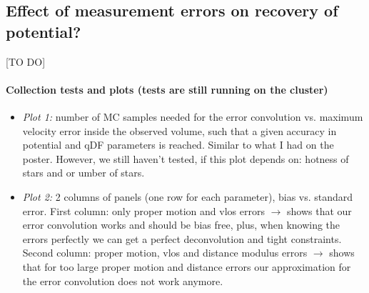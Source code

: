 \subsection{Effect of measurement errors on recovery of potential?} \label{sec:results_errors}

[TO DO]

\paragraph{Collection tests and plots (tests are still running on the cluster)}

\begin{itemize}
\item \emph{Plot 1:} number of MC samples needed for the error convolution vs. maximum velocity error inside the observed volume, such that a given accuracy in potential and qDF parameters is reached. Similar to what I had on the poster. However, we still haven't tested, if this plot depends on: hotness of stars and or umber of stars.

\item \emph{Plot 2:} 2 columns of panels (one row for each parameter), bias vs. standard error. First column: only proper motion and vlos errors $\longrightarrow$ shows that our error convolution works and should be bias free, plus, when knowing the errors perfectly we can get a perfect deconvolution and tight constraints. Second column: proper motion, vlos and distance modulus errors $\longrightarrow$ shows that for too large proper motion and distance errors our approximation for the error convolution does not work anymore.

\end{itemize}

